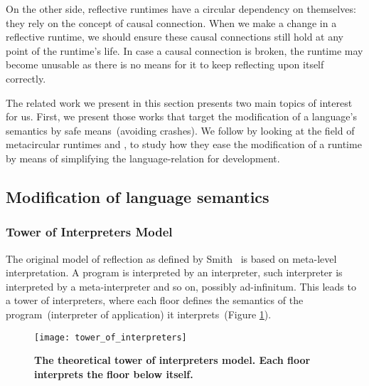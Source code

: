 On the other side, reflective runtimes have a circular dependency on themselves: they rely on the concept of causal connection. When we make a change in a reflective runtime, we should ensure these causal connections still hold at any point of the runtime's life. In case a causal connection is broken, the runtime may become unusable as there is no means for it to keep reflecting upon itself correctly.

The related work we present in this section presents two main topics of interest for us. First, we present those works that target the modification of a language's semantics by safe means~(\ie avoiding crashes). We follow by looking at the field of metacircular runtimes and \VMs, to study how they ease the modification of a runtime by means of simplifying the language-\VM relation for development.

\subsection{Modification of language semantics}

\subsubsection*{Tower of Interpreters Model}

The original model of reflection as defined by Smith~\cite{Smit82c} is based on meta-level interpretation. A program is interpreted by an interpreter, such interpreter is interpreted by a meta-interpreter and so on, possibly ad-infinitum. This leads to a tower of interpreters, where each floor defines the semantics of the program~(interpreter of application) it interprets~(Figure \ref{fig:tower_of_interpreters}).

\begin{figure}[ht]
\begin{center}
\texttt{[image: tower\_of\_interpreters]}
\caption{\textbf{The theoretical tower of interpreters model. Each floor interprets the floor below itself.}\label{fig:tower_of_interpreters}
 }
\end{center}
\end{figure}

